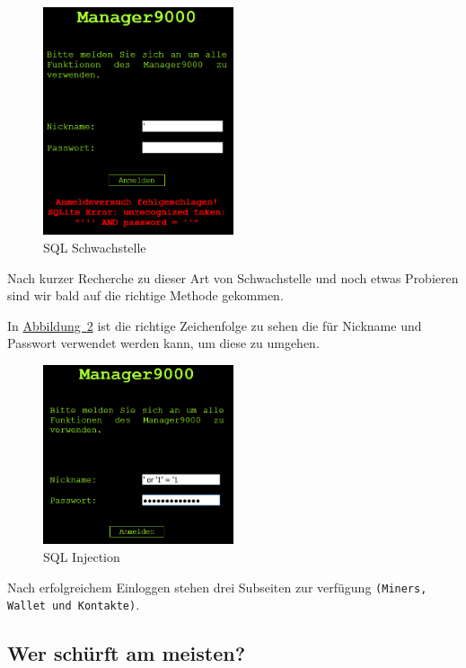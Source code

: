 \documentclass[12pt,a4paper,titlepage,oneside]{scrartcl}
\begin{document}
\begin{figure}[h!]
  \centering
    \includegraphics[width=0.5\textwidth]{./imgs/manager9000/m9000_sql_error1.png}
  \caption{SQL Schwachstelle}
  \label{fig:sql_weakness}
\end{figure}

Nach kurzer Recherche zu dieser Art von Schwachstelle und noch etwas Probieren sind wir bald auf die richtige Methode gekommen.

In \hyperref[fig:sql_injection]{Abbildung~\ref*{fig:sql_injection}} ist die richtige Zeichenfolge zu sehen die für Nickname und Passwort verwendet werden kann, um diese zu umgehen.

\begin{figure}[h!]
  \centering
  \includegraphics[width=0.5\textwidth]{./imgs/manager9000/m9000_sql_injection.png}
\caption{SQL Injection}
\label{fig:sql_injection}
\end{figure}

Nach erfolgreichem Einloggen stehen drei Subseiten zur verfügung \lstinline{(Miners, Wallet und Kontakte)}.

\pagebreak

\subsection{Wer schürft am meisten?}
\end{document}
